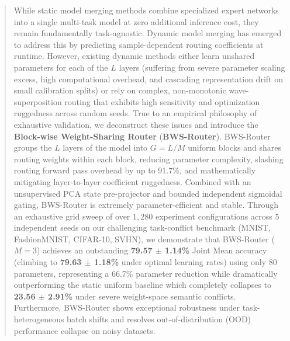 \begin{abstract}
While static model merging methods combine specialized expert networks into a single multi-task model at zero additional inference cost, they remain fundamentally task-agnostic. Dynamic model merging has emerged to address this by predicting sample-dependent routing coefficients at runtime. However, existing dynamic methods either learn unshared parameters for each of the $L$ layers (suffering from severe parameter scaling excess, high computational overhead, and cascading representation drift on small calibration splits) or rely on complex, non-monotonic wave-superposition routing that exhibits high sensitivity and optimization ruggedness across random seeds. True to an empirical philosophy of exhaustive validation, we deconstruct these issues and introduce the \textbf{Block-wise Weight-Sharing Router} (\textbf{BWS-Router}). BWS-Router groups the $L$ layers of the model into $G = L / M$ uniform blocks and shares routing weights within each block, reducing parameter complexity, slashing routing forward pass overhead by up to 91.7\%, and mathematically mitigating layer-to-layer coefficient ruggedness. Combined with an unsupervised PCA state pre-projector and bounded independent sigmoidal gating, BWS-Router is extremely parameter-efficient and stable. Through an exhaustive grid sweep of over $1,280$ experiment configurations across 5 independent seeds on our challenging task-conflict benchmark (MNIST, FashionMNIST, CIFAR-10, SVHN), we demonstrate that BWS-Router ($M=3$) achieves an outstanding \textbf{79.57 $\pm$ 1.14\%} Joint Mean accuracy (climbing to \textbf{79.63 $\pm$ 1.18\%} under optimal learning rates) using only 80 parameters, representing a 66.7\% parameter reduction while dramatically outperforming the static uniform baseline which completely collapses to \textbf{23.56 $\pm$ 2.91\%} under severe weight-space semantic conflicts. Furthermore, BWS-Router shows exceptional robustness under task-heterogeneous batch shifts and resolves out-of-distribution (OOD) performance collapse on noisy datasets.
\end{abstract}
